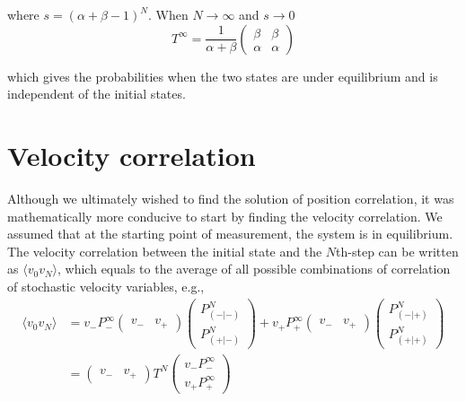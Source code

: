 \documentclass{article}
\begin{document}
where $s=(\alpha+\beta-1)^N$. When $N\rightarrow\infty$ and $s\rightarrow 0$ \\

\begin{equation}
    T^{\infty}=\dfrac{1}{\alpha+\beta} \begin{pmatrix}
        \beta & \beta \\ \alpha & \alpha
    \end{pmatrix}
\end{equation}

which gives the probabilities when the two states are under equilibrium and is independent of
the initial states. \\

\section{Velocity correlation}
Although we ultimately wished to find the solution of position correlation, it was mathematically more conducive to start by finding the velocity correlation. We assumed that at the starting point of measurement, the system is in equilibrium. The velocity correlation between the initial state and the $N$th-step can be written as $\langle v_0 v_N \rangle$, which equals to the average of all possible combinations of correlation of stochastic velocity variables, e.g., \\


\begin{equation}
    \begin{aligned}
        \langle v_0 v_N \rangle 
        &=
            v_- P_-^{\infty} 
                \begin{pmatrix}
                    v_- & v_+
                \end{pmatrix}
                \begin{pmatrix}
                    P_{(-|-)}^N \\ P_{(+|-)}^N
                \end{pmatrix} 
            +
            v_+ P_+^{\infty}
                \begin{pmatrix}
                    v_- & v_+
                \end{pmatrix}
                \begin{pmatrix}
                    P_{(-|+)}^N \\ P_{(+|+)}^N
                \end{pmatrix} \\
        &=
            \begin{pmatrix}
                v_- & v_+
            \end{pmatrix} T^N 
        \begin{pmatrix} v_- P_-^{\infty} \\ v_+ P_+^{\infty} \end{pmatrix}
    \end{aligned}
\end{equation}  \\
\end{document}
